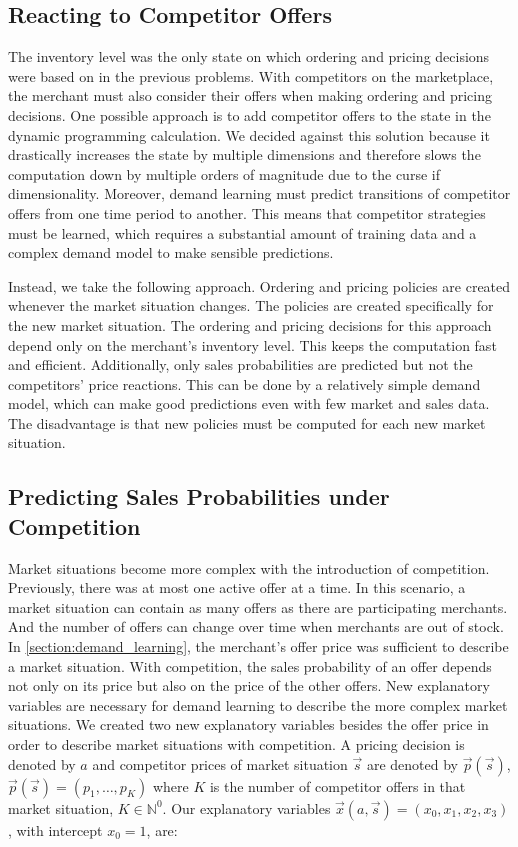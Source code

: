 \subsection{Reacting to Competitor Offers}
The inventory level was the only state on which ordering and pricing decisions were based on in the previous problems.
With competitors on the marketplace, the merchant must also consider their offers when making ordering and pricing decisions.
One possible approach is to add competitor offers to the state in the dynamic programming calculation.
We decided against this solution because it drastically increases the state by multiple dimensions and therefore slows the computation down by multiple orders of magnitude due to the curse if dimensionality.
Moreover, demand learning must predict transitions of competitor offers from one time period to another.
This means that competitor strategies must be learned, which requires a substantial amount of training data and a complex demand model to make sensible predictions.

Instead, we take the following approach.
Ordering and pricing policies are created whenever the market situation changes.
The policies are created specifically for the new market situation.
The ordering and pricing decisions for this approach depend only on the merchant's inventory level.
This keeps the computation fast and efficient.
Additionally, only sales probabilities are predicted but not the competitors' price reactions.
This can be done by a relatively simple demand model, which can make good predictions even with few market and sales data.
The disadvantage is that new policies must be computed for each new market situation.

\subsection{Predicting Sales Probabilities under Competition}

Market situations become more complex with the introduction of competition.
Previously, there was at most one active offer at a time.
In this scenario, a market situation can contain as many offers as there are participating merchants.
And the number of offers can change over time when merchants are out of stock.
In \cref{section:demand_learning}, the merchant's offer price was sufficient to describe a market situation.
With competition, the sales probability of an offer depends not only on its price but also on the price of the other offers.
New explanatory variables are necessary for demand learning to describe the more complex market situations.
We created two new explanatory variables besides the offer price in order to describe market situations with competition.
A pricing decision is denoted by $a$ and competitor prices of market situation $\vec{s}$ are denoted by $\vec{p}(\vec{s})$, $\vec{p}(\vec{s}) = (p_1, \ldots, p_K)$ where $K$ is the number of competitor offers in that market situation, $K \in \mathbb{N}^0$.
Our explanatory variables $\vec{x}(a, \vec{s}) = (x_0, x_1, x_2, x_3)$, with intercept $x_0=1$, are:

